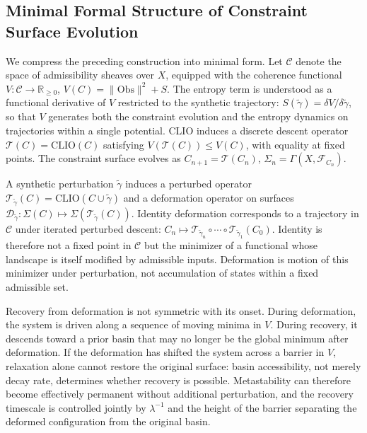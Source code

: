 \documentclass[12pt, a4paper]{article}
\begin{document}
\subsection{Minimal Formal Structure of Constraint Surface Evolution}

We compress the preceding construction into minimal form. Let $\mathcal{C}$ denote the space of admissibility sheaves over $X$, equipped with the coherence functional $V : \mathcal{C} \to \mathbb{R}_{\geq 0}$, $V(C) = \|\mathrm{Obs}\|^2 + S$. The entropy term is understood as a functional derivative of $V$ restricted to the synthetic trajectory: $S(\tilde{\gamma}) = \delta V / \delta \tilde{\gamma}$, so that $V$ generates both the constraint evolution and the entropy dynamics on trajectories within a single potential. CLIO induces a discrete descent operator $\mathcal{T}(C) = \mathrm{CLIO}(C)$ satisfying $V(\mathcal{T}(C)) \leq V(C)$, with equality at fixed points. The constraint surface evolves as $C_{n+1} = \mathcal{T}(C_n)$, $\Sigma_n = \Gamma(X, \mathcal{F}_{C_n})$.

A synthetic perturbation $\tilde{\gamma}$ induces a perturbed operator $\mathcal{T}_{\tilde{\gamma}}(C) = \mathrm{CLIO}(C \cup \tilde{\gamma})$ and a deformation operator on surfaces $\mathcal{D}_{\tilde{\gamma}} : \Sigma(C) \mapsto \Sigma(\mathcal{T}_{\tilde{\gamma}}(C))$. Identity deformation corresponds to a trajectory in $\mathcal{C}$ under iterated perturbed descent: $C_n \mapsto \mathcal{T}_{\tilde{\gamma}_n} \circ \cdots \circ \mathcal{T}_{\tilde{\gamma}_1}(C_0)$. Identity is therefore not a fixed point in $\mathcal{C}$ but the minimizer of a functional whose landscape is itself modified by admissible inputs. Deformation is motion of this minimizer under perturbation, not accumulation of states within a fixed admissible set.

Recovery from deformation is not symmetric with its onset. During deformation, the system is driven along a sequence of moving minima in $V$. During recovery, it descends toward a prior basin that may no longer be the global minimum after deformation. If the deformation has shifted the system across a barrier in $V$, relaxation alone cannot restore the original surface: basin accessibility, not merely decay rate, determines whether recovery is possible. Metastability can therefore become effectively permanent without additional perturbation, and the recovery timescale is controlled jointly by $\lambda^{-1}$ and the height of the barrier separating the deformed configuration from the original basin.
\end{document}
